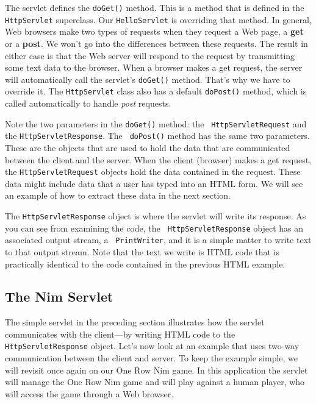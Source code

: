 {{{{\begin{figure}[tb]
\begin{jjjlisting}
\begin{lstlisting}
\end{lstlisting}
\end{jjjlisting}
\end{figure}

The servlet defines the {\tt doGet()} method. This is a method that is
defined in the {\tt HttpServlet} superclass. Our {\tt HelloServlet} is
overriding that method.  In general, Web browsers make two types of
requests when they request a Web page, a {\bf get} or a {\bf post}.  We
won't go into the differences between these requests. The result in
either case is that the Web server will respond to the request by
transmitting some text data to the browser.  When
a browser makes a get request, the server will automatically call the
servlet's {\tt doGet()} method. That's why we have to override it.
The {\tt HttpServlet} class also has a default {\tt doPost()} method,
which is called automatically to handle {\em post} requests.

Note the two parameters in the {\tt doGet()} method: the {\tt
HttpServlet\-Request} and the {\tt HttpServletResponse}.  The {\tt
doPost()} method has the same two parameters. These are the objects
that are used to hold the data that are communicated between the
client and the server.  When the client (browser) makes a get request,
the {\tt HttpServletRequest} objects hold the data contained in
the request. These data might include data that a user has typed into
an HTML form.  We will see an example of how to extract these data
in the next section.  

The {\tt HttpServletResponse} object is where the servlet will write
its response. As you can see from examining the code, the {\tt
HttpServlet\-Response} object has an associated output stream, a {\tt
PrintWriter}, and it is a simple matter to write text to that output
stream.  Note that the text we write is HTML code that is practically
identical to the code contained in the previous HTML example.

\subsection{The Nim Servlet}

The simple servlet in the preceding section illustrates how the
servlet communicates with the client---by writing HTML code to the
{\tt HttpServlet\-Response} object.  Let's now look at an example that
uses two-way communication between the client and server. To keep the
example simple, we will revisit once again on our One Row Nim game.  In
this application the servlet will manage the One Row Nim game and will
play against a human player, who will access the game through a Web
browser.  

}}}}
